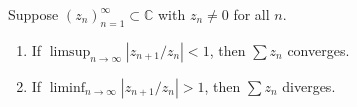 Suppose $(z_n)_{n=1}^{\infty} \subset \mathbb{C}$ with $z_n \neq 0$ for all $n$.
\begin{enumerate}
\item If $\limsup_{n \to \infty} |z_{n+1}/z_n| < 1$, then $\sum z_n$ converges.
\item If $\liminf_{n \to \infty} |z_{n+1}/z_n| > 1$, then $\sum z_n$ diverges.
\end{enumerate}
